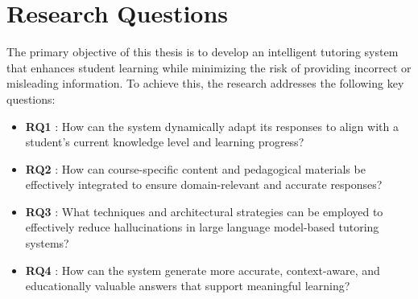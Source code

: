 \section{Research Questions}

The primary objective of this thesis is to develop an intelligent tutoring system that enhances student learning while minimizing the risk of providing incorrect or misleading information. To achieve this, the research addresses the following key questions:

\begin{itemize}
    \item \textbf{RQ1} \label{RQ1}: How can the system dynamically adapt its responses to align with a student's current knowledge level and learning progress?

    \item \textbf{RQ2} \label{RQ2}: How can course-specific content and pedagogical materials be effectively integrated to ensure domain-relevant and accurate responses?

    \item \textbf{RQ3} \label{RQ3}: What techniques and architectural strategies can be employed to effectively reduce hallucinations in large language model-based tutoring systems?

    \item \textbf{RQ4} \label{RQ4}: How can the system generate more accurate, context-aware, and educationally valuable answers that support meaningful learning?
\end{itemize}
